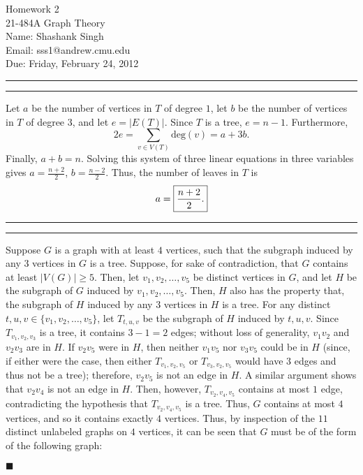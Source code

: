 \documentclass[11pt]{article}
\makeatletter
\newcounter{questionCounter}
\newcounter{partCounter}[questionCounter]
\newenvironment{question}[2][\arabic{questionCounter}]{%
    \setcounter{partCounter}{0}%
    \vspace{.25in} \hrule \vspace{0.5em}%
        \noindent{\bf #2}%
    \vspace{0.8em} \hrule \vspace{.10in}%
    \addtocounter{questionCounter}{1}%
}{}
\newcommand{\myname}{Shashank Singh}
\newcommand{\myandrew}{sss1@andrew.cmu.edu}
\newcommand{\myclass}{21-484A Graph Theory}
\newcommand{\myhwnum}{2}
\newcommand{\duedate}{Friday, February 24, 2012}
\makeatother
\begin{document}
\thispagestyle{plain}

{\Large Homework \myhwnum} \\
\myclass \\
Name: \myname \\
Email: \myandrew \\
Due: \duedate

\begin{question}{Problem 1}
Let $a$ be the number of vertices in $T$ of degree $1$, let $b$ be the number
of vertices in $T$ of degree $3$, and let $e = |E(T)|$. Since $T$ is a tree,
$e = n - 1$. Furthermore, \[2e = \sum_{v \in V(T)} \mbox{deg}(v) = a + 3b.\]
Finally, $a + b = n$. Solving this system of three linear equations in three
variables gives $a = \frac{n + 2}{2}$, $b = \frac{n - 2}{2}$. Thus, the number
of leaves in $T$ is \[a = \mbox{\fbox{$\displaystyle \frac{n + 2}{2}$.}}\]
\end{question}

\begin{question}{Problem 2}
Suppose $G$ is a graph with at least $4$ vertices, such that the subgraph
induced by any $3$ vertices in $G$ is a tree. Suppose, for sake of
contradiction, that $G$ contains at least $|V(G)| \geq 5$. Then, let
$v_1,v_2,\ldots,v_5$ be distinct vertices in $G$, and let $H$ be the subgraph
of $G$ induced by $v_1,v_2,\ldots,v_5$. Then, $H$ also has the property that,
the subgraph of $H$ induced by any $3$ vertices in $H$ is a tree. For any
distinct $t,u,v \in \{v_1,v_2,\ldots,v_5\}$, let $T_{t,u,v}$ be the subgraph
of $H$ induced by $t,u,v$. Since $T_{v_1,v_2,v_3}$ is a tree, it contains
$3 - 1 = 2$ edges; without loss of generality, $v_1v_2$ and $v_2v_3$ are in
$H$. If $v_2v_5$ were in $H$, then neither $v_1v_5$ nor $v_3v_5$ could be in
$H$ (since, if either were the case, then either $T_{v_1,v_2,v_5}$ or
$T_{v_3,v_2,v_5}$ would have $3$ edges and thus not be a tree); therefore,
$v_2v_5$ is not an edge in $H$. A similar argument shows that $v_2v_4$ is not
an edge in $H$. Then, however, $T_{v_2,v_4,v_5}$ contains at most $1$ edge,
contradicting the hypothesis that $T_{v_2,v_4,v_5}$ is a tree. Thus, $G$
contains at most $4$ vertices, and so it contains exactly $4$ vertices. Thus,
by inspection of the $11$ distinct unlabeled graphs on $4$ vertices, it can
be seen that $G$ must be of the form of the following graph:

\begin{center}
\end{center}
$\blacksquare$
\end{question}
\end{document}
